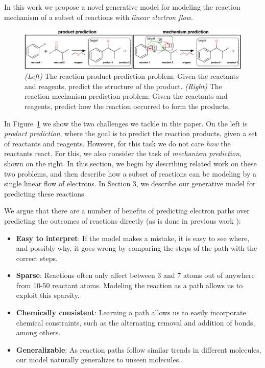 In this work we propose a novel generative model for modeling the reaction mechanism of a subset of reactions with \emph{linear electron flow}.


\begin{figure}[t!]
\centering
\includegraphics[width=\textwidth]{reaction_diagram.pdf}
\caption{\emph{(Left)} The reaction product prediction problem: Given the reactants and reagents, predict the structure of the product. \emph{(Right)} The reaction mechanism prediction problem: Given the reactants and reagents, predict how the reaction occurred to form the products.}
\label{fig:task-overview}

\end{figure}
In Figure~\ref{fig:task-overview} we show the two challenges we tackle in this paper. 
On the left is \emph{product prediction}, where the goal is to predict the reaction products, given a set of reactants and reagents. However, for this task we do not care {\em how} the reactants react. For this, we also consider the task of \emph{mechanism prediction}, shown on the right. In this section, we begin by describing related work on these two problems, and then describe how a subset of reactions can be modeling by a single linear flow of electrons. In Section 3, we describe our generative model for predicting these reactions.



We argue that there are a number of benefits of predicting electron paths over predicting the outcomes of reactions directly (as is done in previous work \cite{jin2017predicting,schwaller2017found}):
\begin{itemize}
\item \textbf{Easy to interpret}: If the model makes a mistake, it is easy to see where, and possibly why, it goes wrong by comparing the steps of the path with the correct steps.
\item \textbf{Sparse}: Reactions often only affect between 3 and 7 atoms out of anywhere from 10-50 reactant atoms. Modeling the reaction as a path allows us to exploit this sparsity.
\item \textbf{Chemically consistent}: Learning a path allows us to easily incorporate chemical constraints, such as the alternating removal and addition of bonds, among others. 
\item \textbf{Generalizable}: As reaction paths follow similar trends in different molecules, our model naturally generalizes to unseen molecules. 
\end{itemize}






